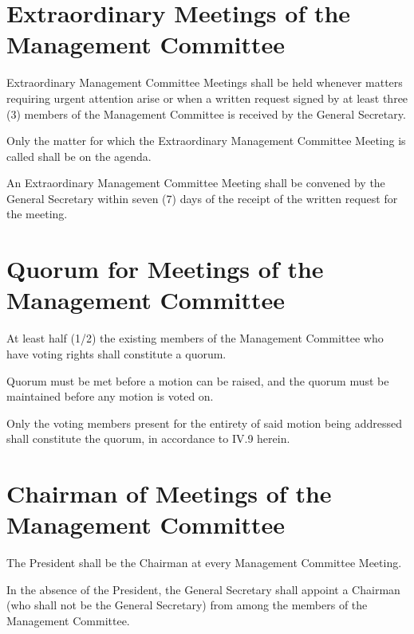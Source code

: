 \section{Extraordinary Meetings of the Management Committee}
Extraordinary Management Committee Meetings shall be held whenever matters requiring urgent attention arise or when a written request signed by at least three (3) members of the Management Committee is received by the General Secretary.
	\begin{legal}
	\item Only the matter for which the Extraordinary Management Committee Meeting is called shall be on the agenda.
	\item An Extraordinary Management Committee Meeting shall be convened by the General Secretary within seven (7) days of the receipt of the written request for the meeting.
	\end{legal}

\section{Quorum for Meetings of the Management Committee}
At least half (1/2) the existing members of the Management Committee who have voting rights shall constitute a quorum.
	\begin{legal}
	\item Quorum must be met before a motion can be raised, and the quorum must be maintained before any motion is voted on.
	\item Only the voting members present for the entirety of said motion being addressed shall constitute the quorum, in accordance to IV.9 herein.
	\end{legal}

\section{Chairman of Meetings of the Management Committee}
The President shall be the Chairman at every Management Committee Meeting.
	\begin{legal}
	\item In the absence of the President, the General Secretary shall appoint a Chairman (who shall not be the General Secretary) from among the members of the Management Committee.
	\end{legal}

